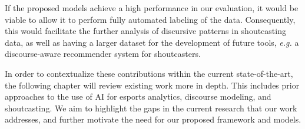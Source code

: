 \medskip

If the proposed models achieve a high performance in our evaluation, it would be viable to allow it to perform fully automated labeling of the data. Consequently, this would facilitate the further analysis of discursive patterns in shoutcasting data, as well as having a larger dataset for the development of future tools, \textit{e.g.} a discourse-aware recommender system for shoutcasters. 

\medskip

In order to contextualize these contributions within the current state-of-the-art, the following chapter will review existing work more in depth. This includes prior approaches to the use of AI for esports analytics, discourse modeling, and shoutcasting. We aim to highlight the gaps in the current research that our work addresses, and further motivate the need for our proposed framework and models.


